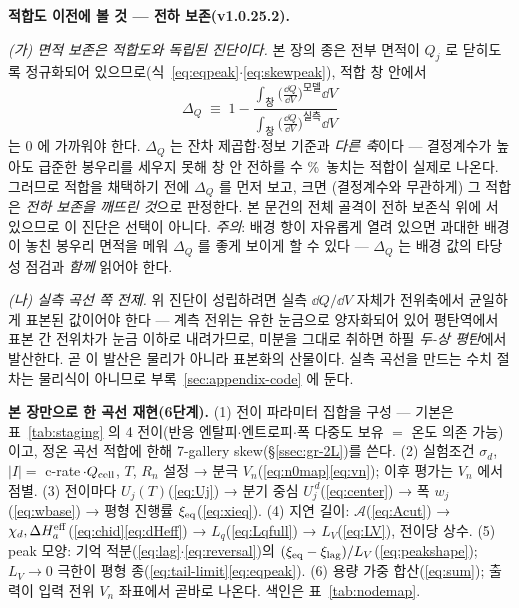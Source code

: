\begin{warnbox}
\textbf{적합도 이전에 볼 것 --- 전하 보존(v1.0.25.2).}

\emph{(가) 면적 보존은 적합도와 \emph{독립된} 진단이다.} 본 장의 종은 전부 면적이 $Q_j$ 로 닫히도록
정규화되어 있으므로(식~\eqref{eq:eqpeak}$\cdot$\eqref{eq:skewpeak}), 적합 창 안에서
\[
\Delta_Q\;\equiv\;1-\frac{\displaystyle\int_\text{창}\Big(\frac{\dd Q}{\dd V}\Big)^\text{모델}\dd V}
{\displaystyle\int_\text{창}\Big(\frac{\dd Q}{\dd V}\Big)^\text{실측}\dd V}
\]
는 0 에 가까워야 한다. $\Delta_Q$ 는 잔차 제곱합$\cdot$정보 기준과 \emph{다른 축}이다 --- 결정계수가
높아도 급준한 봉우리를 세우지 못해 창 안 전하를 수 \%\ 놓치는 적합이 실제로 나온다. 그러므로 적합을
채택하기 전에 $\Delta_Q$ 를 먼저 보고, 크면 (결정계수와 무관하게) 그 적합은 \emph{전하 보존을 깨뜨린
것}으로 판정한다. 본 문건의 전체 골격이 전하 보존식 위에 서 있으므로 이 진단은 선택이 아니다.
\emph{주의}: 배경 항이 자유롭게 열려 있으면 과대한 배경이 놓친 봉우리 면적을 메워 $\Delta_Q$ 를 좋게
보이게 할 수 있다 --- $\Delta_Q$ 는 배경 값의 타당성 점검과 \emph{함께} 읽어야 한다.

\emph{(나) 실측 곡선 쪽 전제.} 위 진단이 성립하려면 실측 $\dd Q/\dd V$ 자체가 전위축에서 균일하게
표본된 값이어야 한다 --- 계측 전위는 유한 눈금으로 양자화되어 있어 평탄역에서 표본 간 전위차가 눈금 이하로
내려가므로, 미분을 그대로 취하면 하필 \emph{두-상 평탄}에서 발산한다. 곧 이 발산은 물리가 아니라 표본화의
산물이다. 실측 곡선을 만드는 수치 절차는 물리식이 아니므로 부록~\ref{sec:appendix-code} 에 둔다.
\end{warnbox}

\begin{keybox}
\textbf{본 장만으로 한 곡선 재현(6단계).}
(1) 전이 파라미터 집합을 구성 --- 기본은 표~\ref{tab:staging} 의 4 전이(반응 엔탈피$\cdot$엔트로피$\cdot$폭
다중도 보유 $=$ 온도 의존 가능)이고, 정온 곡선 적합에 한해 7-gallery skew(\S\ref{ssec:gr-2L})를 쓴다.
(2) 실험조건 $\sigma_d$, $|I|=$ c-rate$\,\cdot Q_{\mathrm{cell}}$, $T$, $R_n$ 설정 → 분극 $V_n$(\eqref{eq:n0map}\eqref{eq:vn}); 이후 평가는 $V_n$ 에서 점별.
(3) 전이마다 $U_j(T)$(\eqref{eq:Uj}) → 분기 중심 $U_j^{\,d}$(\eqref{eq:center}) → 폭 $w_j$(\eqref{eq:wbase}) → 평형 진행률 $\xi_{\mathrm{eq}}$(\eqref{eq:xieq}).
(4) 지연 길이: $\mathcal A$(\eqref{eq:Acut}) → $\chi_d,\Delta H_a^{\mathrm{eff}}$(\eqref{eq:chid}\eqref{eq:dHeff}) → $L_q$(\eqref{eq:Lqfull}) → $L_V$(\eqref{eq:LV}), 전이당 상수.
(5) peak 모양: 기억 적분(\eqref{eq:lag}$\cdot$\eqref{eq:reversal})의 $(\xi_{\mathrm{eq}}-\xi_\mathrm{lag})/L_V$(\eqref{eq:peakshape}); $L_V\to0$ 극한이 평형 종(\eqref{eq:tail-limit}\eqref{eq:eqpeak}).
(6) 용량 가중 합산(\eqref{eq:sum}); 출력이 입력 전위 $V_n$ 좌표에서 곧바로 나온다. 색인은 표~\ref{tab:nodemap}.
\end{keybox}

